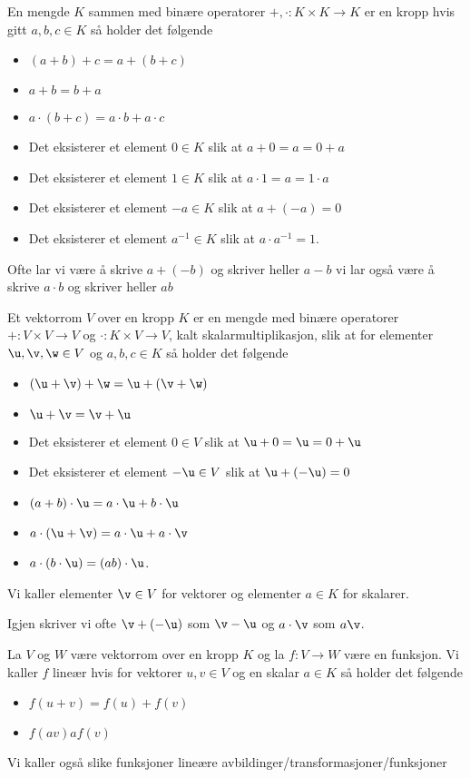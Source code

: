\begin{definition}\label{Def:Kropp}
   En mengde $K$ sammen med binære operatorer $+,\cdot: K\times K\to K$ er en kropp hvis gitt $a,b,c\in K$ så holder det følgende
   \begin{itemize}
    \item $(a+b)+c = a+(b+c)$
    \item $a+b = b+a$
    \item $a\cdot(b+c)=a\cdot b + a\cdot c$
    \item Det eksisterer et element $0\in K$ slik at $a+0=a=0+a$
    \item Det eksisterer et element $1\in K$ slik at $a\cdot 1 = a = 1\cdot a$
    \item Det eksisterer et element $-a\in K$ slik at $a+ (-a) = 0$
    \item Det eksisterer et element $a^{-1}\in K$ slik at $a\cdot a^{-1}=1$.
   \end{itemize} 
\end{definition}
Ofte lar vi være å skrive $a+(-b)$ og skriver heller $a-b$ vi lar også være å skrive $a\cdot b$ og skriver heller $ab$

\begin{definition}\label{Def:Vektrom}
    Et vektorrom $V$ over en kropp $K$ er en mengde med binære operatorer $+:V\times V\to V$ og $\cdot: K\times V\to V$, kalt skalarmultiplikasjon, slik at for elementer $\u,\v,\w\in V$ og $a,b,c\in K$ så holder det følgende
    \begin{itemize}
    \item $(\u+\v)+\w = \u+(\v+\w)$
    \item $\u+\v=\v+\u$
    \item Det eksisterer et element $0\in V$ slik at $\u+0=\u=0+\u$
    \item Det eksisterer et element $-\u\in V$ slik at $\u+(-\u)=0$
    \item $(a+b)\cdot \u = a\cdot \u + b\cdot \u$
    \item $a\cdot(\u+\v) = a\cdot \u + a\cdot \v$
    \item $a\cdot (b\cdot \u) = (ab)\cdot \u$.
    \end{itemize}
    Vi kaller elementer $\v\in V$ for vektorer og elementer $a\in K$ for skalarer.
\end{definition}
Igjen skriver vi ofte $\v+(-\u)$ som $\v-\u$ og $a\cdot \v$ som $a\v$.

\begin{definition}\label{Def:LinAvb}
    La $V$ og $W$ være vektorrom over en kropp $K$ og la $f: V\to W$ være en funksjon. Vi kaller $f$ lineær hvis for vektorer $u,v\in V$ og en skalar $a\in K$ så holder det følgende
    \begin{itemize}
    \item $f(u+v) = f(u)+f(v)$
    \item $f(av) af(v)$
    \end{itemize}
    Vi kaller også slike funksjoner lineære avbildinger/transformasjoner/funksjoner
\end{definition}

